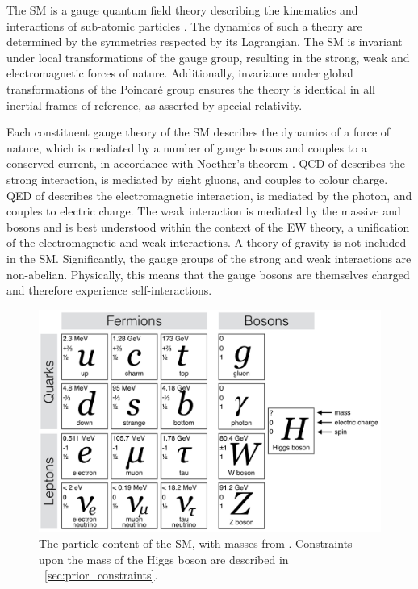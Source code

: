 
The \ac{SM} is a gauge quantum field theory describing the kinematics and interactions of 
sub-atomic particles 
\cite{Aitchison,Peskin,Glashow:1961,Weinberg:1967,Salam:1968,'tHooft:1972}. 
The dynamics of such a theory are determined 
by the symmetries respected by its Lagrangian. The \ac{SM} is invariant under local 
transformations of the \SMgroup gauge group, resulting in the strong, weak and 
electromagnetic forces of nature. Additionally, invariance under global transformations of 
the Poincaré group ensures the theory is identical in all inertial frames of reference, as 
asserted by special relativity.

Each constituent gauge theory of the \ac{SM} describes the dynamics of a force of nature, 
which is mediated by a number of gauge bosons and couples to a conserved current, in 
accordance with Noether's theorem \cite{Noether:1918}. \ac{QCD} of  describes 
the strong interaction, is mediated by eight gluons, and couples to colour charge. \ac{QED}
of  describes the electromagnetic interaction, is mediated by the 
photon, and couples to electric charge. The weak interaction is mediated by the massive 
\PWpm and \PZ bosons and is best understood within the context of the \ac{EW} theory,
a unification of the electromagnetic and weak interactions. A theory of
gravity is not included in the \ac{SM}. Significantly, the gauge groups of 
the strong and weak interactions are non-abelian. Physically, this means that the
gauge bosons are themselves charged and therefore experience self-interactions.

\begin{figure}
	\includegraphics[width=\largefigwidth]{tex/motivation/sm_particles}
	\caption{The particle content of the \ac{SM}, with masses from \cite{PDG:2012}. 
	Constraints upon the mass of the Higgs boson are described in 
	\Section~\ref{sec:prior_constraints}.}
	\label{fig:sm_particles}
\end{figure}

